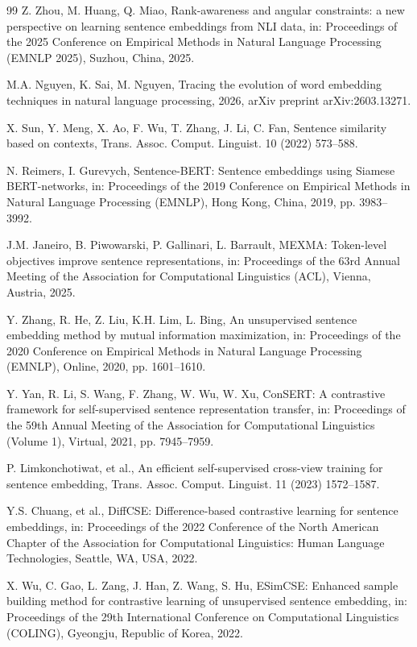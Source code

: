 \documentclass[a4paper,fleqn]{cas-dc}
\begin{document}
\begin{thebibliography}{99}
Z. Zhou, M. Huang, Q. Miao, Rank-awareness and angular constraints: a new perspective on learning sentence embeddings from NLI data, in: Proceedings of the 2025 Conference on Empirical Methods in Natural Language Processing (EMNLP 2025), Suzhou, China, 2025.

M.A. Nguyen, K. Sai, M. Nguyen, Tracing the evolution of word embedding techniques in natural language processing, 2026, arXiv preprint arXiv:2603.13271.

X. Sun, Y. Meng, X. Ao, F. Wu, T. Zhang, J. Li, C. Fan, Sentence similarity based on contexts, Trans. Assoc. Comput. Linguist. 10 (2022) 573--588.

N. Reimers, I. Gurevych, Sentence-BERT: Sentence embeddings using Siamese BERT-networks, in: Proceedings of the 2019 Conference on Empirical Methods in Natural Language Processing (EMNLP), Hong Kong, China, 2019, pp. 3983--3992.

J.M. Janeiro, B. Piwowarski, P. Gallinari, L. Barrault, MEXMA: Token-level objectives improve sentence representations, in: Proceedings of the 63rd Annual Meeting of the Association for Computational Linguistics (ACL), Vienna, Austria, 2025.

Y. Zhang, R. He, Z. Liu, K.H. Lim, L. Bing, An unsupervised sentence embedding method by mutual information maximization, in: Proceedings of the 2020 Conference on Empirical Methods in Natural Language Processing (EMNLP), Online, 2020, pp. 1601--1610.

Y. Yan, R. Li, S. Wang, F. Zhang, W. Wu, W. Xu, ConSERT: A contrastive framework for self-supervised sentence representation transfer, in: Proceedings of the 59th Annual Meeting of the Association for Computational Linguistics (Volume 1), Virtual, 2021, pp. 7945--7959.

P. Limkonchotiwat, et al., An efficient self-supervised cross-view training for sentence embedding, Trans. Assoc. Comput. Linguist. 11 (2023) 1572--1587.

Y.S. Chuang, et al., DiffCSE: Difference-based contrastive learning for sentence embeddings, in: Proceedings of the 2022 Conference of the North American Chapter of the Association for Computational Linguistics: Human Language Technologies, Seattle, WA, USA, 2022.

X. Wu, C. Gao, L. Zang, J. Han, Z. Wang, S. Hu, ESimCSE: Enhanced sample building method for contrastive learning of unsupervised sentence embedding, in: Proceedings of the 29th International Conference on Computational Linguistics (COLING), Gyeongju, Republic of Korea, 2022.


\end{thebibliography}
\end{document}
